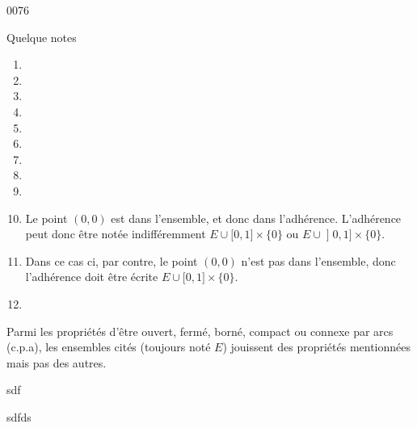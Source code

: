 
\begin{corrige}{0076}

Quelque notes
\begin{enumerate}
\item 
\item 
\item 
\item 
\item 
\item 
\item 
\item 
\item 
\item 
Le point $(0,0)$ est dans l'ensemble, et donc dans l'adhérence. L'adhérence peut donc être notée indifféremment $E \cup \mathopen[0,1\mathclose]\times\{0\}$ ou $E \cup \mathopen]0,1\mathclose]\times\{0\}$.

\item 
Dans ce cas ci, par contre, le point $(0,0)$ n'est pas dans l'ensemble, donc l'adhérence doit être écrite $E \cup \mathopen[0,1\mathclose]\times\{0\}$.
\item 
\end{enumerate}

Parmi les propriétés d'être ouvert, fermé, borné, compact ou connexe par arcs (c.p.a), les ensembles cités (toujours noté $E$) jouissent des propriétés mentionnées mais pas des autres.

sdf

\begin{landscape}
    sdfds
\end{landscape}
\end{corrige}
